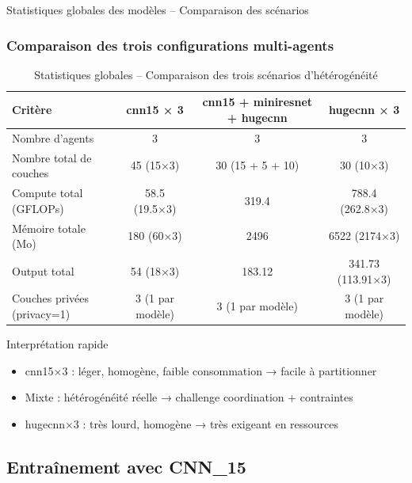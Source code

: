 \documentclass[aspectratio=169]{beamer}
\begin{document}
\begin{frame}{Statistiques globales des modèles – Comparaison des scénarios}
\frametitle{Comparaison des trois configurations multi-agents}

\begin{table}[!h]
\footnotesize
\centering
\renewcommand{\arraystretch}{1.3}
\begin{tabular}{lccc}
\toprule
Critère & cnn15 × 3 & cnn15 + miniresnet + hugecnn & hugecnn × 3 \\
\midrule
Nombre d’agents & 3 & 3 & 3 \\
Nombre total de couches & 45 (15×3) & 30 (15 + 5 + 10) & 30 (10×3) \\
Compute total (GFLOPs) & 58.5 (19.5×3) & 319.4 & 788.4 (262.8×3) \\
Mémoire totale (Mo) & 180 (60×3) & 2496 & 6522 (2174×3) \\
Output total & 54 (18×3) & 183.12 & 341.73 (113.91×3) \\
Couches privées (privacy=1) & 3 (1 par modèle) & 3 (1 par modèle) & 3 (1 par modèle) \\
\bottomrule
\end{tabular}
\caption{Statistiques globales – Comparaison des trois scénarios d’hétérogénéité}
\end{table}

\begin{block}{Interprétation rapide}
\begin{itemize}
    \item cnn15×3 : léger, homogène, faible consommation → facile à partitionner
    \item Mixte : hétérogénéité réelle → challenge coordination + contraintes
    \item hugecnn×3 : très lourd, homogène → très exigeant en ressources
\end{itemize}
\end{block}
\end{frame}

\subsection{ Entraînement avec CNN\_15}
\end{document}

